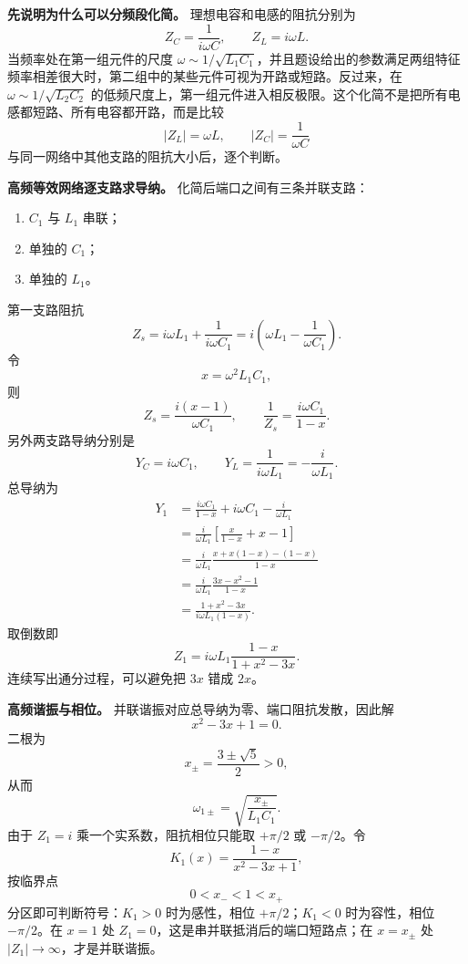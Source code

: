 \documentclass[12pt,a4paper,UTF8]{ctexart}
\newcommand{\tightlist}{\setlength{\itemsep}{0pt}\setlength{\parskip}{0pt}}
\begin{document}
\textbf{先说明为什么可以分频段化简。} 理想电容和电感的阻抗分别为 \[
Z_C=\frac1{i\omega C},\qquad Z_L=i\omega L.
\] 当频率处在第一组元件的尺度
\(\omega\sim1/\sqrt{L_1C_1}\)，并且题设给出的参数满足两组特征频率相差很大时，第二组中的某些元件可视为开路或短路。反过来，在
\(\omega\sim1/\sqrt{L_2C_2}\)
的低频尺度上，第一组元件进入相反极限。这个化简不是把所有电感都短路、所有电容都开路，而是比较
\[
|Z_L|=\omega L,\qquad |Z_C|=\frac1{\omega C}
\] 与同一网络中其他支路的阻抗大小后，逐个判断。

\textbf{高频等效网络逐支路求导纳。} 化简后端口之间有三条并联支路：

\begin{enumerate}
\def\labelenumi{\arabic{enumi}.}
\tightlist
\item
  \(C_1\) 与 \(L_1\) 串联；
\item
  单独的 \(C_1\)；
\item
  单独的 \(L_1\)。
\end{enumerate}

第一支路阻抗 \[
Z_s=i\omega L_1+\frac1{i\omega C_1}
=i\left(\omega L_1-\frac1{\omega C_1}\right).
\] 令 \[
x=\omega^2L_1C_1,
\] 则 \[
Z_s=\frac{i(x-1)}{\omega C_1},\qquad
\frac1{Z_s}=\frac{i\omega C_1}{1-x}.
\] 另外两支路导纳分别是 \[
Y_C=i\omega C_1,\qquad
Y_L=\frac1{i\omega L_1}=-\frac{i}{\omega L_1}.
\] 总导纳为 \[
\begin{aligned}
Y_1
&=\frac{i\omega C_1}{1-x}+i\omega C_1-\frac{i}{\omega L_1}\\
&=\frac{i}{\omega L_1}\left[
\frac{x}{1-x}+x-1
\right]\\
&=\frac{i}{\omega L_1}
\frac{x+x(1-x)-(1-x)}{1-x}\\
&=\frac{i}{\omega L_1}
\frac{3x-x^2-1}{1-x}\\
&=\frac{1+x^2-3x}{i\omega L_1(1-x)}.
\end{aligned}
\] 取倒数即 \[
Z_1=i\omega L_1\frac{1-x}{1+x^2-3x}.
\] 连续写出通分过程，可以避免把 \(3x\) 错成 \(2x\)。

\textbf{高频谐振与相位。} 并联谐振对应总导纳为零、端口阻抗发散，因此解
\[
x^2-3x+1=0.
\] 二根为 \[
x_{\pm}=\frac{3\pm\sqrt5}{2}>0,
\] 从而 \[
\omega_{1\pm}
=\sqrt{\frac{x_\pm}{L_1C_1}}.
\] 由于 \(Z_1=i\) 乘一个实系数，阻抗相位只能取 \(+\pi/2\) 或
\(-\pi/2\)。令 \[
K_1(x)=\frac{1-x}{x^2-3x+1},
\] 按临界点 \[
0<x_-<1<x_+
\] 分区即可判断符号：\(K_1>0\) 时为感性，相位 \(+\pi/2\)；\(K_1<0\)
时为容性，相位 \(-\pi/2\)。在 \(x=1\) 处
\(Z_1=0\)，这是串并联抵消后的端口短路点；在 \(x=x_\pm\) 处
\(|Z_1|\to\infty\)，才是并联谐振。
\end{document}
